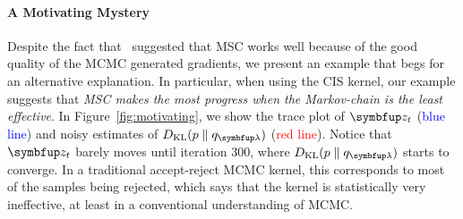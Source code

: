 \paragraph{A Motivating Mystery}
Despite the fact that~\citeauthor{NEURIPS2020_b2070693} suggested that MSC works well because of the good quality of the MCMC generated gradients, we present an example that begs for an alternative explanation.
In particular, when using the CIS kernel, our example suggests that \textit{MSC makes the most progress when the Markov-chain is the least effective}.
In Figure~\ref{fig:motivating}, we show the trace plot of \(\vz_t\) (\textcolor{blue}{blue line}) and noisy estimates of \(\DKL{p}{q_{\vlambda}}\) (\textcolor{red}{red line}).
Notice that \(\vz_t\) barely moves until iteration 300, where \(\DKL{p}{q_{\vlambda}}\) starts to converge.
In a traditional accept-reject MCMC kernel, this corresponds to most of the samples being rejected, which says that the kernel is statistically very ineffective, at least in a conventional understanding of MCMC.


%


